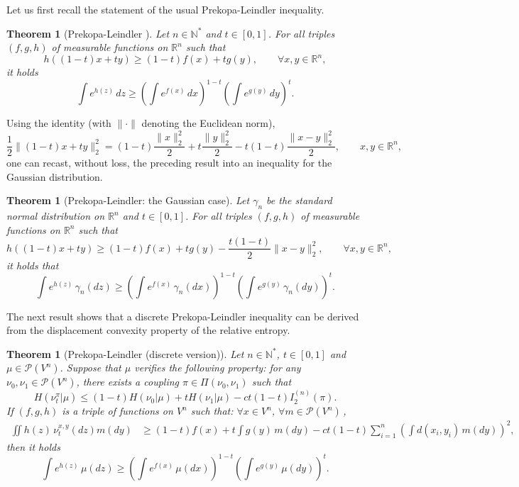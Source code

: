 \documentclass[11pt]{amsart}
\newtheorem{thm}[equation]{Theorem}
\numberwithin{equation}{section}
\begin{document}
Let us first recall the statement of the usual Prekopa-Leindler inequality.

\begin{thm}[Prekopa-Leindler \cite{prekopa2,prekopa1,leindler}]
Let $n\in {\mathbb{N}}^*$ and $t\in [0,1]$. For all triples $(f,g,h)$ of measurable functions on ${\mathbb{R}}^n$ such that
$$h((1-t)x+ty)\geq (1-t)f(x)+tg(y),\qquad \forall x,y\in{\mathbb{R}}^n,$$
it holds
$$\int e^{h(z)}\,dz \geq \left(\int e^{f(x)}\,dx\right)^{1-t}\left(\int e^{g(y)}\,dy\right)^t.$$
\end{thm}
Using the identity (with $\| \cdot \|$ denoting the Euclidean norm),
$$
\frac{1}{2}\|(1-t)x+ty\|_2^2=(1-t)\frac{\|x\|_2^2}{2}+t\frac{\|y\|_2^2}{2}-t(1-t)\frac{\|x-y\|_2^2}{2}, 
\qquad x,y \in \mathbb{R}^n,
$$
one can recast, without loss, the preceding result into an inequality for the Gaussian distribution.
\begin{thm}[Prekopa-Leindler: the Gaussian case]\label{prekopagauss}
Let $\gamma_n$ be the standard normal distribution on ${\mathbb{R}}^n$ and $t\in [0,1]$. For all triples $(f,g,h)$ of measurable functions on ${\mathbb{R}}^n$ such that
\begin{equation}\label{usualpl}
h((1-t)x+ty)\geq (1-t)f(x)+tg(y)-\frac{t(1-t)}{2}\|x-y\|_2^2,\qquad \forall x,y\in {\mathbb{R}}^n,
\end{equation}
it holds that
$$
\int e^{h(z)}\,\gamma_n(dz) \geq \left(\int e^{f(x)}\,\gamma_n(dx)\right)^{1-t}\left(\int e^{g(y)}\,\gamma_n(dy)\right)^t.
$$
\end{thm}

The next result shows that a discrete Prekopa-Leindler inequality can be derived from the displacement convexity property of the relative entropy. 
\begin{thm}[Prekopa-Leindler (discrete version)] \label{th:dpl}
Let $n\in {\mathbb{N}}^*$, $t\in [0,1]$ and $\mu\in \mathcal{P}(V^n)$. Suppose that $\mu$ verifies the following  property: for any $\nu_0, \nu_1 \in \mathcal{P}(V^n)$, there exists a coupling $\pi \in \Pi(\nu_0,\nu_1)$ such that
\begin{equation} \label{hyppl1}
H(\nu_t^\pi |\mu) \leq (1-t) H(\nu_0|\mu) + t H(\nu_1|\mu) - ct(1-t) I_2^{(n)}(\pi).
\end{equation}
If $(f,g,h)$ is a triple of functions on $V^n$ such that: $\forall x\in V^n$, $\forall m\in \mathcal{P}(V^n)$\,,
\begin{align} \label{hyppl2}
\iint h(z) \,\nu_t^{x,y}(dz) m(dy)  
& \geq 
(1-t)f(x) + t \int g (y)\,m(dy)  
-ct(1-t) \sum_{i=1}^n \left(\int d(x_i,y_i)\,m(dy)\right)^2,
\end{align}
then it holds
$$
\int e^{h(z)}\,\mu(dz) \geq \left( \int e^{f(x)}\,\mu(dx) \right)^{1-t} \left( \int e^{g(y)} \,\mu(dy) \right)^t  .
$$
\end{thm}
\end{document}

